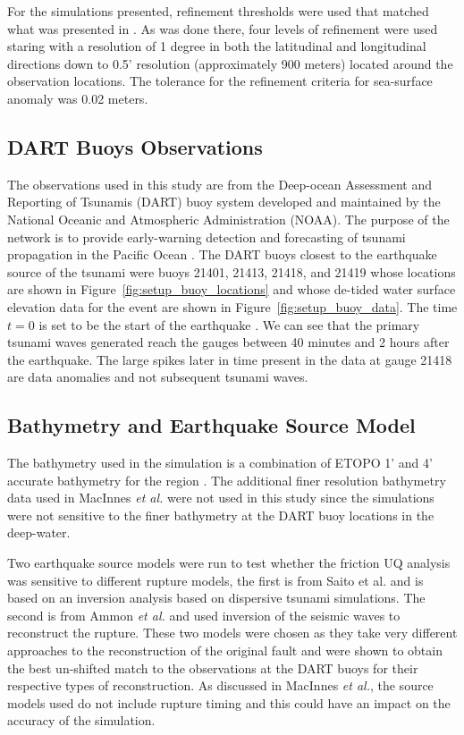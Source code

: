 For the simulations presented, refinement thresholds were used that matched what was presented in \cite{MacInnes:2013cr}.  As was done there, four levels of refinement were used staring with a resolution of 1 degree in both the latitudinal and longitudinal directions down to 0.5' resolution (approximately 900 meters) located around the observation locations.  The tolerance for the refinement criteria for sea-surface anomaly was 0.02 meters.

\subsection{DART Buoys Observations}

The observations used in this study are from the Deep-ocean Assessment and
Reporting of Tsunamis (DART) buoy system developed and maintained by the
National Oceanic and Atmospheric Administration (NOAA).  The purpose of the
network is to provide early-warning detection and forecasting of tsunami
propagation in the Pacific Ocean \cite{Milburn:1996wm}.  The DART buoys closest
to the earthquake source of the \tohoku tsunami were buoys 21401, 21413, 21418,
and 21419 whose locations are shown in Figure~\ref{fig:setup_buoy_locations} and
whose de-tided water surface elevation data for the event are shown in Figure~\ref{fig:setup_buoy_data}.
The time $t=0$ is set to be the start of the earthquake .  We can see that the
primary tsunami waves generated reach the gauges between 40 minutes and 2 hours
after the earthquake.  The large spikes later in time present in the data at
gauge 21418 are data anomalies and not subsequent tsunami waves.

\subsection{Bathymetry and Earthquake Source Model}

The bathymetry used in the simulation is a combination of ETOPO 1' and 4'
accurate bathymetry for the region \cite{Amante:2009ud}.  The additional finer
resolution bathymetry data used in MacInnes \emph{et al.} were not used in this
study since the simulations were not sensitive to the finer bathymetry at the
DART buoy locations in the deep-water.

Two earthquake source models were run to test whether the friction UQ analysis
was sensitive to different rupture models, the first is from Saito et al.
\cite{Saito:2011bh} and is based on an inversion analysis based on dispersive
tsunami simulations.  The second is from Ammon \emph{et al.} \cite{Ammon:2011dm} and
used inversion of the seismic waves to reconstruct the rupture.  These two
models were chosen as they take very different approaches to the reconstruction
of the original fault and were shown to obtain the best un-shifted match to the
observations at the DART buoys for their respective types of reconstruction.  As
discussed in MacInnes \emph{et al.}, the source models used do not include rupture
timing and this could have an impact on the accuracy of the simulation.


